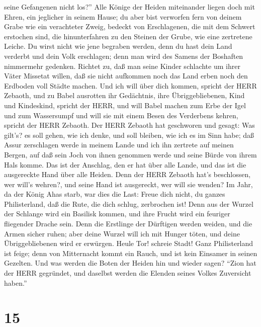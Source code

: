 seine Gefangenen nicht los?''  Alle Könige der Heiden
miteinander liegen doch mit Ehren, ein jeglicher in seinem Hause;
 du aber bist verworfen fern von deinem Grabe wie ein
verachteter Zweig, bedeckt von Erschlagenen, die mit dem Schwert
erstochen sind, die hinunterfahren zu den Steinen der Grube, wie eine
zertretene Leiche.  Du wirst nicht wie jene begraben
werden, denn du hast dein Land verderbt und dein Volk erschlagen; denn
man wird des Samens der Boshaften nimmermehr gedenken. 
Richtet zu, daß man seine Kinder schlachte um ihrer Väter Missetat
willen, daß sie nicht aufkommen noch das Land erben noch den Erdboden
voll Städte machen.  Und ich will über dich kommen, spricht
der HERR Zebaoth, und zu Babel ausrotten ihr Gedächtnis, ihre
Übriggebliebenen, Kind und Kindeskind, spricht der HERR, 
und will Babel machen zum Erbe der Igel und zum Wassersumpf und will sie
mit einem Besen des Verderbens kehren, spricht der HERR Zebaoth.
 Der HERR Zebaoth hat geschworen und gesagt: Was gilt's? es
soll gehen, wie ich denke, und soll bleiben, wie ich es im Sinn habe;
 daß Assur zerschlagen werde in meinem Lande und ich ihn
zertrete auf meinen Bergen, auf daß sein Joch von ihnen genommen werde
und seine Bürde von ihrem Hals komme.  Das ist der
Anschlag, den er hat über alle Lande, und das ist die ausgereckte Hand
über alle Heiden.  Denn der HERR Zebaoth hat's beschlossen,
wer will's wehren?, und seine Hand ist ausgereckt, wer will sie wenden?
 Im Jahr, da der König Ahas starb, war dies die Last:
 Freue dich nicht, du ganzes Philisterland, daß die Rute,
die dich schlug, zerbrochen ist! Denn aus der Wurzel der Schlange wird
ein Basilisk kommen, und ihre Frucht wird ein feuriger fliegender Drache
sein.  Denn die Erstlinge der Dürftigen werden weiden, und
die Armen sicher ruhen; aber deine Wurzel will ich mit Hunger töten, und
deine Übriggebliebenen wird er erwürgen.  Heule Tor!
schreie Stadt! Ganz Philisterland ist feige; denn von Mitternacht kommt
ein Rauch, und ist kein Einsamer in seinen Gezelten.  Und
was werden die Boten der Heiden hin und wieder sagen? ``Zion hat der
HERR gegründet, und daselbst werden die Elenden seines Volkes Zuversicht
haben.''

\hypertarget{section-14}{%
\section{15}\label{section-14}}

